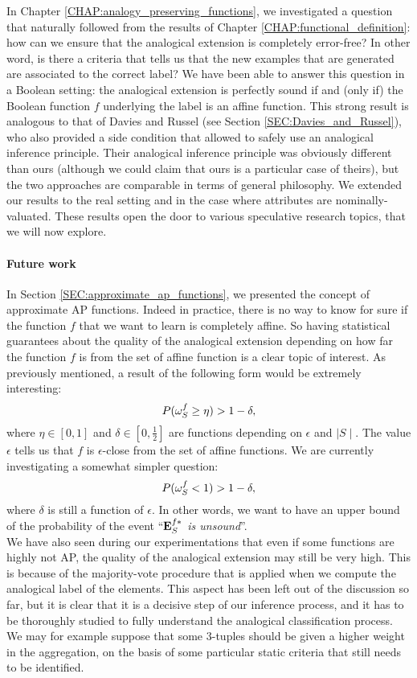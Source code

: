 In Chapter \ref{CHAP:analogy_preserving_functions}, we investigated a question
that naturally followed from the results of Chapter
\ref{CHAP:functional_definition}: how can we ensure that the analogical
extension is completely error-free? In other word, is there a criteria that
tells us that the new examples that are generated are associated to the correct
label? We have been able to answer this question in a Boolean setting: the
analogical extension is perfectly sound if and (only if) the Boolean function
$f$ underlying the label is an affine function. This strong result
\cite{CouHugPraRicIJCAI17} is analogous to that of Davies and Russel (see
Section \ref{SEC:Davies_and_Russel}), who also provided a side condition that
allowed to safely use an analogical inference principle. Their analogical
inference principle was obviously different than ours (although we could claim
that ours is a particular case of theirs), but the two approaches are
comparable in terms of general philosophy. We extended our results to the real
setting and in the case where attributes are nominally-valuated. These results
open the door to various speculative research topics, that we will now explore.

\paragraph{Future work\\}

In Section \ref{SEC:approximate_ap_functions}, we presented the concept of
approximate AP functions. Indeed in practice, there is no way
to know for sure if the function $f$ that we want to learn is completely
affine. So having statistical guarantees about the quality of the analogical
extension depending on how far the function $f$ is from the set of affine
function is a clear topic of interest. As previously mentioned, a result of the
following form would be extremely interesting:
$$P(\omega_{S}^{f} \geq \eta) > 1 - \delta,$$
where $\eta \in [0, 1]$ and $\delta \in [0, \frac{1}{2}]$ are functions
depending on $\epsilon$ and $\mid S \mid$. The value $\epsilon$ tells us that
$f$ is $\epsilon$-close from the set of affine functions.  We are currently
investigating a somewhat simpler question:
$$P(\omega_{S}^{f} < 1) > 1 - \delta,$$
where $\delta$ is still a function of $\epsilon$. In other words, we want to
have an upper bound of the probability of the event ``\textit{$\mathbf{E}_{S}^{f*}$ is
unsound}''.\\

We have also seen during our experimentations that even if some functions are
highly not AP, the quality of the analogical extension may still be very high.
This is because of the majority-vote procedure that is applied when we compute
the analogical label of the elements. This aspect has been left out of the
discussion so far, but it is clear that it is a decisive step of our inference
process, and it has to be thoroughly studied to fully understand the analogical
classification process. We may for example suppose that some $3$-tuples should
be given a higher weight in the aggregation, on the basis of some particular
static criteria that still needs to be identified.\\

